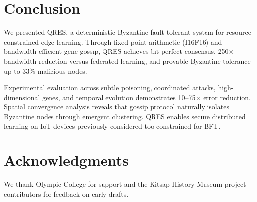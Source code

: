 \documentclass[conference,10pt]{IEEEtran}
\begin{document}
\section{Conclusion}
\label{sec:conclusion}

We presented QRES, a deterministic Byzantine fault-tolerant system for resource-constrained edge learning. Through fixed-point arithmetic (I16F16) and bandwidth-efficient gene gossip, QRES achieves bit-perfect consensus, 250$\times$ bandwidth reduction versus federated learning, and provable Byzantine tolerance up to 33\% malicious nodes.

Experimental evaluation across subtle poisoning, coordinated attacks, high-dimensional genes, and temporal evolution demonstrates 10--75$\times$ error reduction. Spatial convergence analysis reveals that gossip protocol naturally isolates Byzantine nodes through emergent clustering. QRES enables secure distributed learning on IoT devices previously considered too constrained for BFT.

\section*{Acknowledgments}
We thank Olympic College for support and the Kitsap History Museum project contributors for feedback on early drafts.
\end{document}
